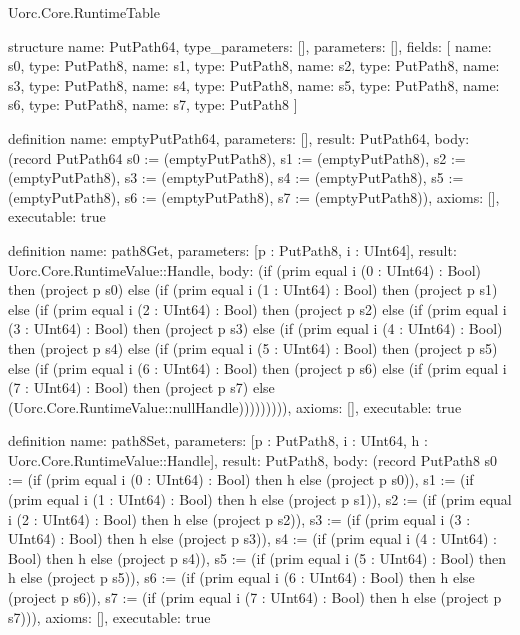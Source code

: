 \begin{lexlean}{Uorc.Core.RuntimeTable}
\begin{semanticmodule}
structure{
  name: PutPath64,
  type_parameters: [],
  parameters: [],
  fields: [
    {name: s0, type: PutPath8},
    {name: s1, type: PutPath8},
    {name: s2, type: PutPath8},
    {name: s3, type: PutPath8},
    {name: s4, type: PutPath8},
    {name: s5, type: PutPath8},
    {name: s6, type: PutPath8},
    {name: s7, type: PutPath8}
  ]
}

definition{
  name: emptyPutPath64,
  parameters: [],
  result: PutPath64,
  body: (record PutPath64 {s0 := (emptyPutPath8), s1 := (emptyPutPath8), s2 := (emptyPutPath8), s3 := (emptyPutPath8), s4 := (emptyPutPath8), s5 := (emptyPutPath8), s6 := (emptyPutPath8), s7 := (emptyPutPath8)}),
  axioms: [],
  executable: true
}

definition{
  name: path8Get,
  parameters: [p : PutPath8, i : UInt64],
  result: Uorc.Core.RuntimeValue::Handle,
  body: (if (prim equal i (0 : UInt64) : Bool) then (project p s0) else (if (prim equal i (1 : UInt64) : Bool) then (project p s1) else (if (prim equal i (2 : UInt64) : Bool) then (project p s2) else (if (prim equal i (3 : UInt64) : Bool) then (project p s3) else (if (prim equal i (4 : UInt64) : Bool) then (project p s4) else (if (prim equal i (5 : UInt64) : Bool) then (project p s5) else (if (prim equal i (6 : UInt64) : Bool) then (project p s6) else (if (prim equal i (7 : UInt64) : Bool) then (project p s7) else (Uorc.Core.RuntimeValue::nullHandle))))))))),
  axioms: [],
  executable: true
}

definition{
  name: path8Set,
  parameters: [p : PutPath8, i : UInt64, h : Uorc.Core.RuntimeValue::Handle],
  result: PutPath8,
  body: (record PutPath8 {s0 := (if (prim equal i (0 : UInt64) : Bool) then h else (project p s0)), s1 := (if (prim equal i (1 : UInt64) : Bool) then h else (project p s1)), s2 := (if (prim equal i (2 : UInt64) : Bool) then h else (project p s2)), s3 := (if (prim equal i (3 : UInt64) : Bool) then h else (project p s3)), s4 := (if (prim equal i (4 : UInt64) : Bool) then h else (project p s4)), s5 := (if (prim equal i (5 : UInt64) : Bool) then h else (project p s5)), s6 := (if (prim equal i (6 : UInt64) : Bool) then h else (project p s6)), s7 := (if (prim equal i (7 : UInt64) : Bool) then h else (project p s7))}),
  axioms: [],
  executable: true
}


\end{semanticmodule}
\end{lexlean}
